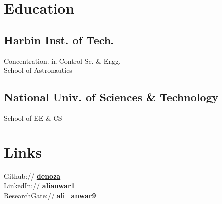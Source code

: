 \documentclass[a4paper]{deedy-resume} %
\begin{document}
\begin{minipage}[t]{0.33\textwidth} %


\section{Education} 

\subsection{Harbin Inst. of Tech.}


\sectionspace %

Concentration. in Control Sc. \& Engg. \\
School of Astronautics \\

\sectionspace %


\subsection{National Univ. of Sciences \& Technology}


School of EE \& CS 

\sectionspace %


\section{Links} 

Github:// \href{https://github.com/denoza}{\bf denoza} \\
LinkedIn:// \href{https://www.linkedin.com/in/alianwar1}{\bf alianwar1} \\
ResearchGate:// \href{https://www.researchgate.net/profile/Ali_Anwar9}{\bf ali\_anwar9} \\


\end{minipage}
\end{document}
